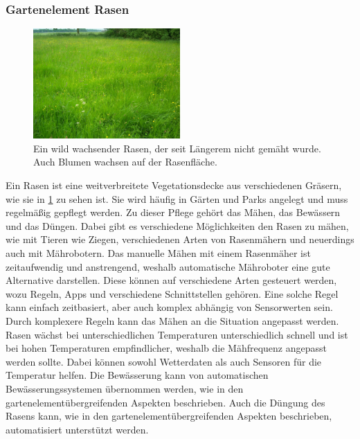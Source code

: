 \subsubsection{Gartenelement Rasen}
\begin{figure}[!htb]
	\centering
	\includegraphics[width=0.5\textwidth]{images/Rasen.jpg}
	\caption[Bild eines wild wachsenden Rasens, der seit Längerem nicht gemäht wurde.]{
		Ein wild wachsender Rasen, der seit Längerem nicht gemäht wurde.
		Auch Blumen wachsen auf der Rasenfläche.\footnotemark
	}
	\label{pic:rasen}
\end{figure}


Ein Rasen ist eine weitverbreitete Vegetationsdecke aus verschiedenen Gräsern, wie sie in \cref{pic:rasen} zu sehen ist.
Sie wird häufig in Gärten und Parks angelegt und muss regelmäßig gepflegt werden.
Zu dieser Pflege gehört das Mähen, das Bewässern und das Düngen.
Dabei gibt es verschiedene Möglichkeiten den Rasen zu mähen, wie mit Tieren wie Ziegen, verschiedenen Arten von Rasenmähern und neuerdings auch mit Mährobotern.
Das manuelle Mähen mit einem Rasenmäher ist zeitaufwendig und anstrengend, weshalb automatische Mähroboter eine gute Alternative darstellen.
Diese können auf verschiedene Arten gesteuert werden, wozu Regeln, Apps und verschiedene Schnittstellen gehören.
Eine solche Regel kann einfach zeitbasiert, aber auch komplex abhängig von Sensorwerten sein.
Durch komplexere Regeln kann das Mähen an die Situation angepasst werden.
Rasen wächst bei unterschiedlichen Temperaturen unterschiedlich schnell und ist bei hohen Temperaturen empfindlicher, weshalb die Mähfrequenz angepasst werden sollte.
Dabei können sowohl Wetterdaten als auch Sensoren für die Temperatur helfen.
Die Bewässerung kann von automatischen Bewässerungssystemen übernommen werden, wie in den gartenelementübergreifenden Aspekten beschrieben.
Auch die Düngung des Rasens kann, wie in den gartenelementübergreifenden Aspekten beschrieben, automatisiert unterstützt werden.

